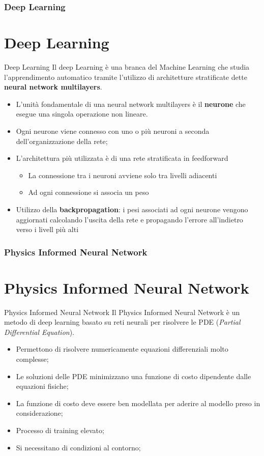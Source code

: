 \documentclass{beamer}
\begin{document}
\begin{frame}
	\frametitle{Deep Learning}
	\section{Deep Learning}
	\begin{block}{Deep Learning}
		Il deep Learning è una branca del Machine Learning che studia l'apprendimento automatico tramite l'utilizzo di architetture stratificate dette \textbf{neural  network multilayers}.
	\end{block}
	\begin{itemize}
		\item L'unità fondamentale di una neural network multilayers è il \textbf{neurone} che esegue una singola operazione non lineare.
		\item Ogni neurone viene connesso con uno o più neuroni a seconda dell'organizzazione della rete;
		\item L'architettura più utilizzata è di una rete stratificata in feedforward\begin{itemize}
			\item La connessione tra i neuroni avviene solo tra livelli adiacenti
			\item Ad ogni connessione si associa un peso
		\end{itemize}
		\item Utilizzo della \textbf{backpropagation}: i pesi associati ad ogni neurone vengono aggiornati calcolando l'uscita della rete e propagando l'errore all'indietro verso i livell più alti
	\end{itemize}
\end{frame}
\begin{frame}
	\frametitle{Physics Informed Neural Network}
	\section{Physics Informed Neural Network}
	\begin{block}{Physics Informed Neural Network}
		Il Physics Informed Neural Network è un metodo di deep learning basato su reti neurali per risolvere le PDE (\emph{Partial Differential Equation}).
	\end{block}
	\begin{itemize}
		\item Permettono di risolvere numericamente equazioni differenziali molto complesse;
		\item Le soluzioni delle PDE minimizzano una funzione di costo dipendente dalle equazioni fisiche;
		\item La funzione di costo deve essere ben modellata per aderire al modello preso in considerazione;
		\item Processo di training elevato;
		\item Si necessitano di condizioni al contorno;
	\end{itemize}
\end{frame}
\end{document}
